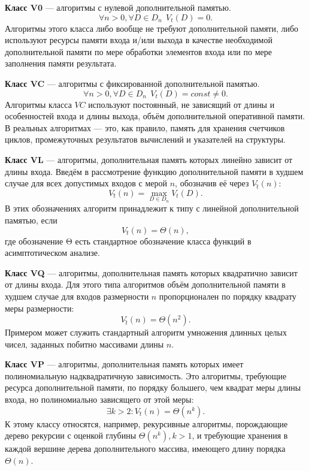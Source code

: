 \textbf{Класс V0} --- алгоритмы с нулевой дополнительной памятью.
\begin{equation}
	\forall n > 0, \forall D \in D_n ~~V_t(D) = 0.
\end{equation}
Алгоритмы этого класса либо вообще не требуют дополнительной памяти, либо используют ресурсы памяти входа и/или выхода в качестве необходимой дополнительной памяти по мере обработки элементов входа или по мере заполнения памяти результата.~\cite{uljanov}

\textbf{Класс VC} --- алгоритмы с фиксированной дополнительной памятью.
\begin{equation}
	\forall n > 0, \forall D \in D_n ~~	V_t(D) = const \neq 0.
\end{equation}
Алгоритмы класса $VC$ используют постоянный, не зависящий от длины и особенностей входа и длины выхода, объём дополнительной оперативной памяти. В реальных алгоритмах --- это, как правило, память для хранения счетчиков циклов, промежуточных результатов вычислений и указателей на структуры.~\cite{uljanov}

\textbf{Класс VL} --- алгоритмы, дополнительная память которых линейно зависит от длины входа. Введём в рассмотрение функцию дополнительной памяти в худшем случае для всех допустимых входов с мерой $n$, обозначив её через $V\hat{_t}(n)$:
\begin{equation}
	V\hat{_t}(n) = \max_{D \in D_n}V_t(D).
\end{equation}
В этих обозначениях алгоритм принадлежит к типу с линейной дополнительной памятью, если
\begin{equation}
	V\hat{_t}(n) = \Theta(n),
\end{equation}
где обозначение Θ есть стандартное обозначение класса функций в асимптотическом анализе.~\cite{uljanov}

\textbf{Класс VQ} --- алгоритмы, дополнительная память которых квадратично зависит от длины входа. Для этого типа алгоритмов объём дополнительной памяти в худшем случае для входов размерности $n$ пропорционален по порядку квадрату меры размерности:
\begin{equation}
	V\hat{_t}(n) = \Theta(n^2).
\end{equation}
Примером может служить стандартный алгоритм умножения длинных целых чисел, заданных побитно массивами длины $n$.~\cite{uljanov}

\textbf{Класс VP} --- алгоритмы, дополнительная память которых имеет полиномиальную надквадратичную зависимость. Это алгоритмы, требующие ресурса дополнительной памяти, по порядку большего, чем квадрат меры длины входа, но полиномиально зависящего от этой меры:
\begin{equation}
	\exists k > 2: V\hat{_t}(n) = \Theta(n^k).
\end{equation}	
К этому классу относятся, например, рекурсивные алгоритмы, порождающие дерево рекурсии с оценкой глубины $\Theta(n^k), k > 1$, и требующие хранения в каждой вершине дерева дополнительного массива, имеющего длину порядка $\Theta(n)$.~\cite{uljanov}

